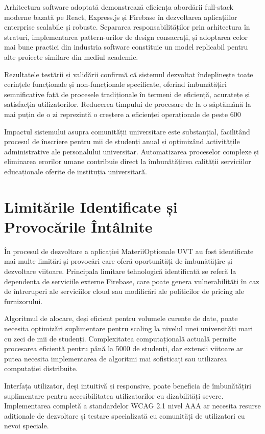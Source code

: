\documentclass[12pt,a4paper]{report}
\begin{document}
Arhitectura software adoptată demonstrează eficiența abordării full-stack moderne bazată pe React, Express.js și Firebase în dezvoltarea aplicațiilor enterprise scalabile și robuste. Separarea responsabilităților prin arhitectura în straturi, implementarea pattern-urilor de design consacrați, și adoptarea celor mai bune practici din industria software constituie un model replicabil pentru alte proiecte similare din mediul academic.

Rezultatele testării și validării confirmă că sistemul dezvoltat îndeplinește toate cerințele funcționale și non-funcționale specificate, oferind îmbunătățiri semnificative față de procesele tradiționale în termeni de eficiență, acuratețe și satisfacția utilizatorilor. Reducerea timpului de procesare de la o săptămână la mai puțin de o zi reprezintă o creștere a eficienței operaționale de peste 600%

Impactul sistemului asupra comunității universitare este substanțial, facilitând procesul de înscriere pentru mii de studenți anual și optimizând activitățile administrative ale personalului universitar. Automatizarea proceselor complexe și eliminarea erorilor umane contribuie direct la îmbunătățirea calității serviciilor educaționale oferite de instituția universitară.

\section{Limitările Identificate și Provocările Întâlnite}

În procesul de dezvoltare a aplicației MateriiOptionale UVT au fost identificate mai multe limitări și provocări care oferă oportunități de îmbunătățire și dezvoltare viitoare. Principala limitare tehnologică identificată se referă la dependența de serviciile externe Firebase, care poate genera vulnerabilități în caz de întreruperi ale serviciilor cloud sau modificări ale politicilor de pricing ale furnizorului.

Algoritmul de alocare, deși eficient pentru volumele curente de date, poate necesita optimizări suplimentare pentru scaling la nivelul unei universități mari cu zeci de mii de studenți. Complexitatea computațională actuală permite procesarea eficientă pentru până la 5000 de studenți, dar extensii viitoare ar putea necesita implementarea de algoritmi mai sofisticați sau utilizarea computației distribuite.

Interfața utilizator, deși intuitivă și responsive, poate beneficia de îmbunătățiri suplimentare pentru accesibilitatea utilizatorilor cu dizabilități severe. Implementarea completă a standardelor WCAG 2.1 nivel AAA ar necesita resurse adiționale de dezvoltare și testare specializată cu comunități de utilizatori cu nevoi speciale.
\end{document}
